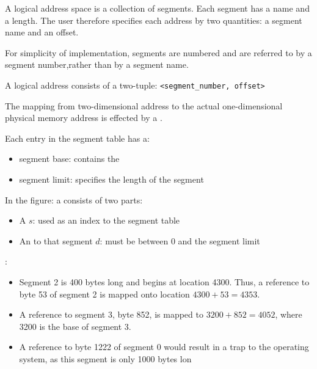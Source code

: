     \par A logical address space is a collection of segments. Each segment has a name and a length. The user therefore specifies each address by two quantities: a segment name and an offset.
    \par For simplicity of implementation, segments are numbered and are referred to by a segment number,rather than by a segment name.
    \par A logical address consists of a two-tuple: \lstinline{<segment_number, offset>}

    \par The mapping from two-dimensional address to the actual one-dimensional physical memory address is effected by a .
    \par Each entry in the segment table has a:
    \begin{itemize}
      \item segment base: contains the 
      \item segment limit: specifies the length of the segment
    \end{itemize}


    \par In the figure: a  consists of two parts:
    \begin{itemize}
      \item A  $s$: used as an index to the segment table
      \item An  to that segment $d$: must be between 0 and the segment limit
    \end{itemize}


    \par {}:
    \begin{itemize}
      \item Segment 2 is 400 bytes long and begins at location 4300. Thus, a reference to byte 53 of segment 2 is mapped onto location $4300 +53 = 4353$.
      \item A reference to segment 3, byte 852, is mapped to $3200 + 852 = 4052$, where 3200 is the base of segment 3.
      \item A reference to byte 1222 of segment 0 would result in a trap to the operating system, as this segment is only 1000 bytes lon
    \end{itemize}

